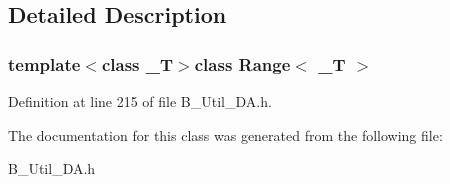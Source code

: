 \subsection{Detailed Description}
\subsubsection*{template$<$class \-\_\-\-T$>$class Range$<$ \-\_\-\-T $>$}



Definition at line 215 of file B\-\_\-\-Util\-\_\-\-D\-A.\-h.



The documentation for this class was generated from the following file\-:\begin{DoxyCompactItemize}
\item 
B\-\_\-\-Util\-\_\-\-D\-A.\-h\end{DoxyCompactItemize}
